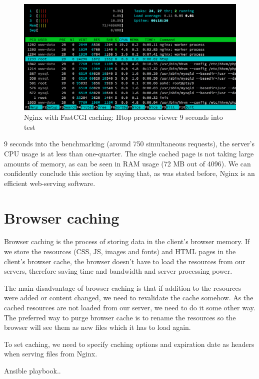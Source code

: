 \begin{figure}[H]
\begin{center}
\includegraphics[scale=0.5]{figures/Nginx_FastCGI_caching_9s.png}
\caption{Nginx with FastCGI caching: Htop process viewer 9 seconds into test}
\label{fig:nginx_fastcgi_caching}
\end{center}
\end{figure}

9 seconds into the benchmarking (around 750 simultaneous requests), the server's CPU usage is at less than one-quarter. The single cached page is not taking large amounts of memory, as can be seen in RAM usage (72 MB out of 4096). We can confidently conclude this section by saying that, as was stated before, Nginx is an efficient web-serving software.

\section{Browser caching}

Browser caching is the process of storing data in the client's browser memory. If we store the resources (CSS, JS, images and fonts) and HTML pages in the client's browser cache, the browser doesn't have to load the resources from our servers, therefore saving time and bandwidth and server processing power.

The main disadvantage of browser caching is that if addition to the resources were added or content changed, we need to revalidate the cache somehow. As the cached resources are not loaded from our server, we need to do it some other way. The preferred way to purge browser cache is to rename the resources so the browser will see them as new files which it has to load again.

To set caching, we need to specify caching options and expiration date as headers when serving files from Nginx. 

Ansible playbook..
